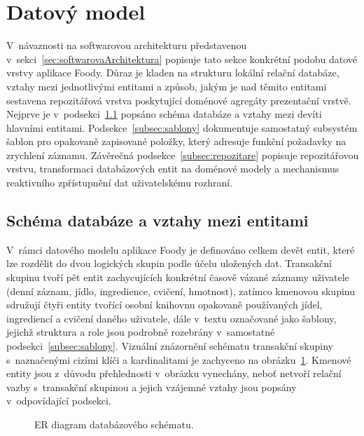 \section{Datový model}
\label{sec:datovyModel}

V~návaznosti na softwarovou architekturu představenou v~sekci~\ref{sec:softwarovaArchitektura} popisuje tato sekce konkrétní podobu datové vrstvy aplikace Foody.
Důraz je kladen na strukturu lokální relační databáze, vztahy mezi jednotlivými entitami a způsob, jakým je nad těmito entitami sestavena repozitářová vrstva poskytující doménové agregáty prezentační vrstvě.
Nejprve je v~podsekci~\ref{subsec:schemaDb} popsáno schéma databáze a vztahy mezi devíti hlavními entitami.
Podsekce~\ref{subsec:sablony} dokumentuje samostatný subsystém šablon pro opakovaně zapisované položky, který adresuje funkční požadavky na zrychlení záznamu.
Závěrečná podsekce~\ref{subsec:repozitare} popisuje repozitářovou vrstvu, transformaci databázových entit na doménové modely a mechanismus reaktivního zpřístupnění dat uživatelskému rozhraní.

\subsection{Schéma databáze a vztahy mezi entitami}
\label{subsec:schemaDb}

V~rámci datového modelu aplikace Foody je definováno celkem devět entit, které lze rozdělit do dvou logických skupin podle účelu uložených dat.
Transakční skupinu tvoří pět entit zachycujících konkrétní časově vázané záznamy uživatele (denní záznam, jídlo, ingredience, cvičení, hmotnost), zatímco kmenovou skupinu sdružují čtyři entity tvořící osobní knihovnu opakovaně používaných jídel, ingrediencí a cvičení daného uživatele, dále v~textu označované jako šablony, jejichž struktura a role jsou podrobně rozebrány v~samostatné podsekci~\ref{subsec:sablony}.
Vizuální znázornění schématu transakční skupiny s~naznačenými cizími klíči a kardinalitami je zachyceno na obrázku~\ref{fig:erDiagram}.
Kmenové entity jsou z~důvodu přehlednosti v~obrázku vynechány, neboť netvoří relační vazby s~transakční skupinou a jejich vzájemné vztahy jsou popsány v~odpovídající podsekci.

\begin{figure}[!htb]
	\centering
	\resizebox{\textwidth}{!}{}
	\caption{ER diagram databázového schématu.}
	\label{fig:erDiagram}
\end{figure}

